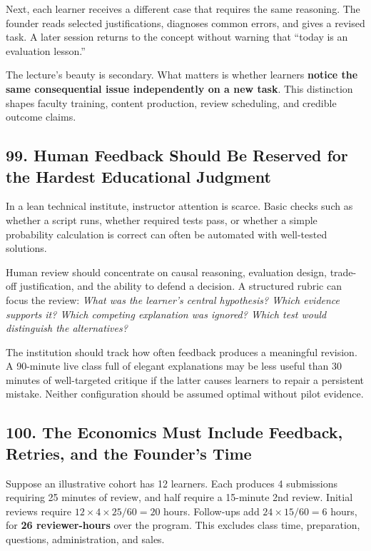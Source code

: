 Next, each learner receives a different case that requires the same reasoning. The founder reads selected justifications, diagnoses common errors, and gives a revised task. A later session returns to the concept without warning that ``today is an evaluation lesson.''

The lecture's beauty is secondary. What matters is whether learners \textbf{notice the same consequential issue independently on a new task}. This distinction shapes faculty training, content production, review scheduling, and credible outcome claims.

\subsection*{99. Human Feedback Should Be Reserved for the Hardest Educational Judgment}

In a lean technical institute, instructor attention is scarce. Basic checks such as whether a script runs, whether required tests pass, or whether a simple probability calculation is correct can often be automated with well-tested solutions.

Human review should concentrate on causal reasoning, evaluation design, trade-off justification, and the ability to defend a decision. A structured rubric can focus the review: \emph{What was the learner's central hypothesis? Which evidence supports it? Which competing explanation was ignored? Which test would distinguish the alternatives?}

The institution should track how often feedback produces a meaningful revision. A 90-minute live class full of elegant explanations may be less useful than 30 minutes of well-targeted critique if the latter causes learners to repair a persistent mistake. Neither configuration should be assumed optimal without pilot evidence.

\subsection*{100. The Economics Must Include Feedback, Retries, and the Founder's Time}

Suppose an illustrative cohort has 12 learners. Each produces 4 submissions requiring 25 minutes of review, and half require a 15-minute 2nd review. Initial reviews require $12 \times 4 \times 25 / 60 = 20$ hours. Follow-ups add $24 \times 15 / 60 = 6$ hours, for \textbf{26 reviewer-hours} over the program. This excludes class time, preparation, questions, administration, and sales.

